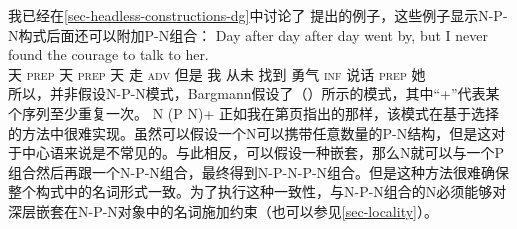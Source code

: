 \begin{exe}
\begin{xlist}[iv.]
\begin{exe}
\begin{xlist}[iv.]
我已经在\ref{sec-headless-constructions-dg}中讨论了 \citet{Bargmann2015a}提出的例子，这些例子显示N-P-N构式后面还可以附加P-N组合：
\ea
\gll Day after day after day went by, but I never found the courage to talk to her.\\
	 天 \textsc{prep} 天 \textsc{prep} 天 走 \textsc{adv} 但是 我 从未 找到  勇气 \textsc{inf} 说话 \textsc{prep} 她\\
\z
所以，并非假设N-P-N模式，Bargmann假设了（）所示的模式，其中“+”\isce{$+$}{$+$}代表某个序列至少重复一次。
\ea
N (P N)+
\z
正如我在第\pageref{n-p-n-plus-cx}页指出的那样，该模式在基于选择的方法中很难实现。虽然可以假设一个N可以携带任意数量的P-N结构，但是这对于中心语来说是不常见的。与此相反，可以假设一种嵌套，那么N就可以与一个P组合然后再跟一个N-P-N组合，最终得到N-P-N-P-N组合。但是这种方法很难确保整个构式中的名词形式一致。为了执行这种一致性，与N-P-N组合的N必须能够对深层嵌套在N-P-N对象中的名词施加约束（也可以参见\ref{sec-locality}）。


\end{xlist}
\end{exe}
\end{xlist}
\end{exe}
